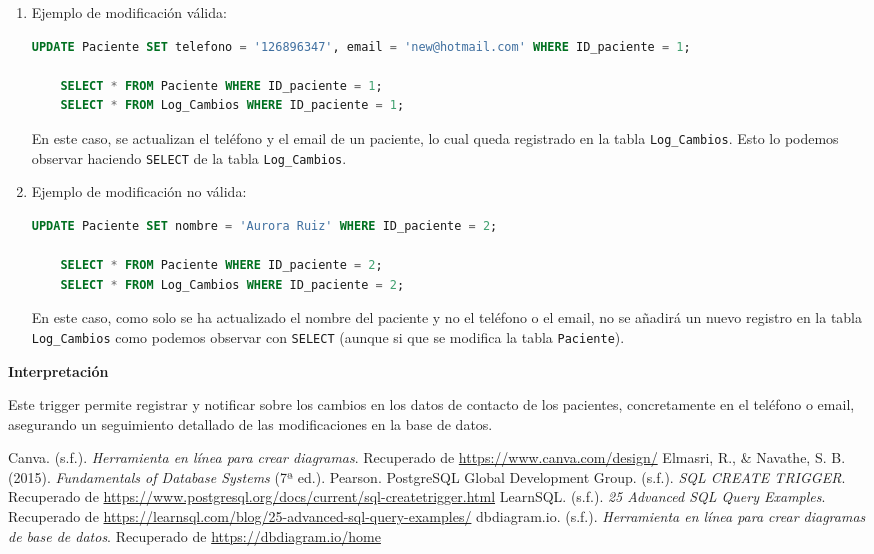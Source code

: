 \documentclass[spanish]{article}
\begin{document}
\begin{enumerate}
    \item Ejemplo de modificación válida:

    \begin{lstlisting}[language=SQL] 
    UPDATE Paciente SET telefono = '126896347', email = 'new@hotmail.com' WHERE ID_paciente = 1; 
    
    SELECT * FROM Paciente WHERE ID_paciente = 1;
    SELECT * FROM Log_Cambios WHERE ID_paciente = 1; 
    \end{lstlisting}

    En este caso, se actualizan el teléfono y el email de un paciente, lo cual queda registrado en la tabla \texttt{Log\_Cambios}. Esto lo podemos observar haciendo \texttt{SELECT} de la tabla \texttt{Log\_Cambios}.

    \item Ejemplo de modificación no válida:

    \begin{lstlisting}[language=SQL]
    UPDATE Paciente SET nombre = 'Aurora Ruiz' WHERE ID_paciente = 2;
    
    SELECT * FROM Paciente WHERE ID_paciente = 2;
    SELECT * FROM Log_Cambios WHERE ID_paciente = 2; 
    \end{lstlisting}

    En este caso, como solo se ha actualizado el nombre del paciente y no el teléfono o el email, no se añadirá un nuevo registro en la tabla \texttt{Log\_Cambios} como podemos observar con \texttt{SELECT} (aunque si que se modifica la tabla \texttt{Paciente}).
    
\end{enumerate}

\textbf{Interpretación}

Este trigger permite registrar y notificar sobre los cambios en los datos de contacto de los pacientes, concretamente en el teléfono o email, asegurando un seguimiento detallado de las modificaciones en la base de datos.


\cleardoublepage
{}

\begin{thebibliography}{9}
     Canva. (s.f.). \textit{Herramienta en línea para crear diagramas}. Recuperado de \url{https://www.canva.com/design/}
     Elmasri, R., \& Navathe, S. B. (2015). \textit{Fundamentals of Database Systems} (7ª ed.). Pearson.
     PostgreSQL Global Development Group. (s.f.). \textit{SQL CREATE TRIGGER}. Recuperado de \url{https://www.postgresql.org/docs/current/sql-createtrigger.html}
     LearnSQL. (s.f.). \textit{25 Advanced SQL Query Examples}. Recuperado de \url{https://learnsql.com/blog/25-advanced-sql-query-examples/}
     dbdiagram.io. (s.f.). \textit{Herramienta en línea para crear diagramas de base de datos}. Recuperado de \url{https://dbdiagram.io/home}
\end{thebibliography}
\end{document}
